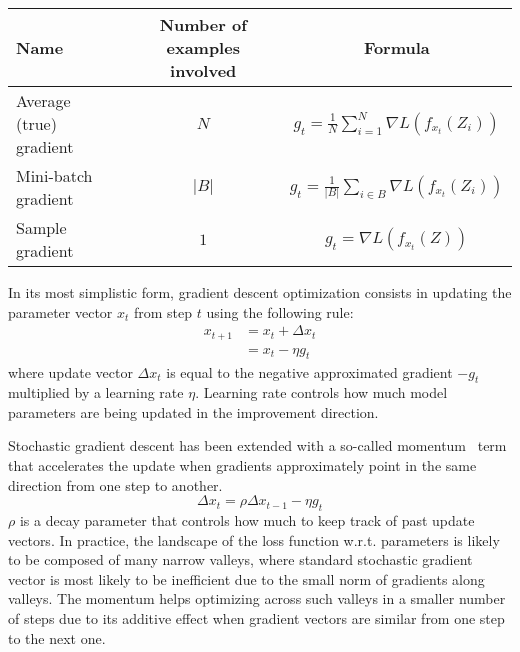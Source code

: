         \begin{table}[H]
            \centering
            \begin{tabular}{|l|c|c|}
                \hline
                Name & Number of examples involved & Formula \\
                \hline
                \hline
                Average (true) gradient & $N$ & $g_t = \frac{1}{N} \sum\limits_{i=1}^N \nabla L(f_{x_t}(Z_i))$ \\
                \hline
                Mini-batch gradient & $\vert B \vert$ & $g_t = \frac{1}{\vert B \vert} \sum\limits_{i \in B} \nabla L(f_{x_t}(Z_i))$ \\
                \hline
                Sample gradient & $1$ & $g_t = \nabla L(f_{x_t}(Z))$ \\
                \hline
            \end{tabular}
            \label{tab:gradients}
        \end{table}

        In its most simplistic form, gradient descent optimization consists in updating the parameter vector $x_t$
        from step $t$ using the following rule:
        \begin{align}
            x_{t+1} & = x_t + \Delta x_t \\
            & = x_t - \eta g_t
        \end{align}
        where update vector $\Delta x_t$ is equal to the negative approximated gradient $-g_t$ multiplied by
        a learning rate $\eta$. Learning rate controls how much model parameters are being updated
        in the improvement direction.

        Stochastic gradient descent has been extended with a so-called momentum~\cite{rumelhart1988learning}
        term that accelerates
        the update when gradients approximately point in the same direction from one step to another.
        \begin{equation}
            \Delta x_t = \rho \Delta x_{t-1} - \eta g_t
        \end{equation}
        $\rho$ is a decay parameter that controls how much to keep track of past update vectors.
        In practice, the landscape of the loss function w.r.t. parameters is likely to be composed of many
        narrow valleys, where standard stochastic gradient vector is most likely to be inefficient
        due to the small norm of gradients along valleys.
        The momentum helps optimizing across such valleys in a smaller number of steps
        due to its additive effect when gradient vectors are similar from one step to the next one.

